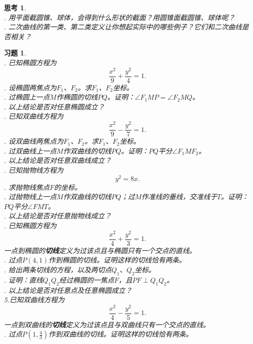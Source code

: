 \documentclass[12pt,UTF8]{ctexbook}
\theoremstyle{definition}
\theoremstyle{plain}
\newtheorem{sk}{思考}[section]
\newtheorem{xt}{习题}[section]
\begin{document}
\begin{sk}
    \mbox{} \\
    . 用平面截圆锥、球体，会得到什么形状的截面？用圆锥面截圆锥、球体呢？\\
    . 二次曲线的第一类、第二类定义让你想起实际中的哪些例子？它们和二次曲线是否相关？
\end{sk}

\begin{xt}
    \mbox{} \\
    . 已知椭圆方程为
    $$ \frac{x^2}{9} + \frac{y^2}{4} = 1.$$
    . 设椭圆两焦点为$F_1$、$F_2$。求$F_1$、$F_2$坐标。\\
    . 过椭圆上一点$M$作椭圆的切线$PQ$。证明：$\angle F_1MP = \angle F_2MQ$。\\
    . 以上结论是否对任意椭圆成立？\\
    . 已知双曲线方程为
    $$ \frac{x^2}{9} - \frac{y^2}{7} = 1.$$
    . 设双曲线两焦点为$F_1$、$F_2$。求$F_1$、$F_2$坐标。\\
    . 过双曲线上一点$M$作双曲线的切线$PQ$。证明：$PQ$平分$\angle F_1MF_2$。\\
    . 以上结论是否对任意双曲线成立？\\
    . 已知抛物线方程为
    $$ y^2 = 8x.$$
    . 求抛物线焦点$F$的坐标。\\
    . 过抛物线上一点$M$作双曲线的切线$PQ$；过$M$作准线的垂线，交准线于$T$。证明：$PQ$平分$\angle FMT$。\\
    . 以上结论是否对任意抛物线成立？\\
    . 已知椭圆方程为
    $$ \frac{x^2}{4} + \frac{y^2}{3} = 1.$$
    一点到椭圆的\textbf{切线}定义为过该点且与椭圆只有一个交点的直线。\\
    . 过点$P(4, 1)$作到椭圆的切线。证明这样的切线恰有两条。\\
    . 给出两条切线的方程，以及两切点$Q_1$、$Q_2$坐标。\\
    . 证明：直线$Q_1Q_2$经过椭圆的一焦点$F$，且$PF\perp Q_1Q_2$。\\
    . 以上结论是否对任意点及任意椭圆成立？\\
    \indent 5.已知双曲线方程为
    $$ \frac{x^2}{4} - \frac{y^2}{5} = 1.$$ 
    一点到双曲线的\textbf{切线}定义为过该点且与双曲线只有一个交点的直线。\\
    . 过点$P\left(1, \frac{4}{3}\right)$作到双曲线的切线。证明这样的切线恰有两条。\\

\end{xt}
\end{document}
